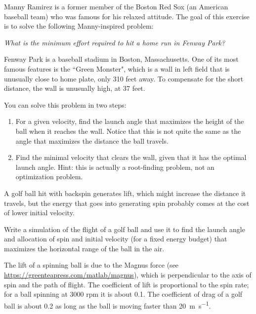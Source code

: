 \begin{ex}


Manny Ramirez is a former member of the Boston Red Sox (an American baseball team) who was famous for his relaxed attitude.  The goal of this exercise is to solve the following Manny-inspired problem:

{\it What is the minimum effort required to hit a home run in Fenway Park?}


Fenway Park is a baseball stadium in Boston, Massachusetts.  One of its most famous features is the ``Green Monster", which is a wall in left field that is unusually close to home plate, only 310 feet away.  To compensate for the short distance, the wall is unusually high, at 37 feet.


You can solve this problem in two steps:

\begin{enumerate}

\item For a given velocity, find the launch angle that maximizes the height of the ball when it reaches the wall.  Notice that this is not quite the same as the angle that maximizes the distance the ball travels.


\item Find the minimal velocity that clears the wall, given that it has the optimal launch angle.  Hint: this is actually a root-finding problem, not an optimization problem.

\end{enumerate}

\end{ex}

\begin{ex}
\label{golf}


A golf ball hit with backspin generates lift, which might increase the distance it travels, but the energy that goes into generating spin probably comes at the cost of lower initial velocity.

Write a simulation of the flight of a golf ball and use it to find
the launch angle and allocation of spin and initial velocity
(for a fixed energy budget) that maximizes the horizontal range of the
ball in the air.

The lift of a spinning ball is due to the Magnus force (see
\url{https://greenteapress.com/matlab/magnus}), which is
perpendicular to the axis of spin and the path of flight.  The
coefficient of lift is proportional to the spin rate; for a ball
spinning at 3000 rpm it is about 0.1.  The coefficient of drag of a
golf ball is about 0.2 as long as the ball is moving faster than \SI{20}{\meter\per\second}.

\end{ex}

